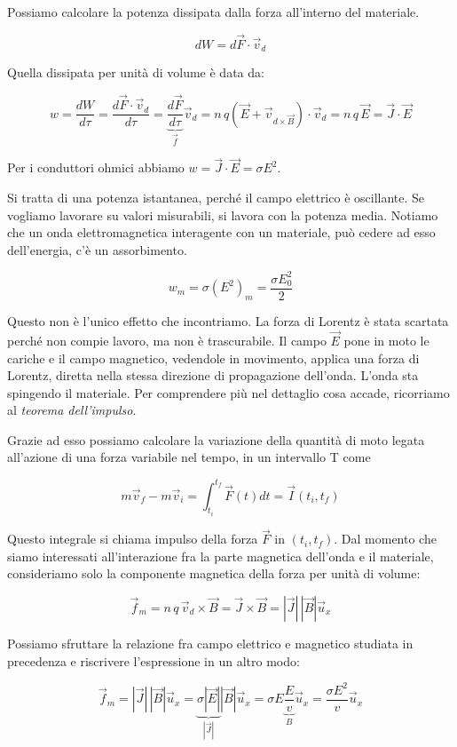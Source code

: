 Possiamo calcolare la potenza dissipata dalla forza all'interno del materiale.

\[
	dW=d\vec{F} \cdot \vec{v}_d
\]

Quella dissipata per unità di volume è data da:

\[
	w=\frac{dW}{d\tau}=\frac{d\vec{F} \cdot \vec{v}_d}{d\tau} = \underbrace{\frac{d\vec{F}}{d\tau}}_{\vec{f}}   \vec{v}_d  = n\,q(\vec{E} +\vec{v}_{d\times \vec{B}}  )\cdot \vec{v}_d = n\,q\,\vec{E} =\vec{J} \cdot \vec{E}
\]

Per i conduttori ohmici abbiamo $w = \vec{J} \cdot \vec{E} =\sigma E^2$.

Si tratta di una potenza istantanea, perché il campo elettrico è oscillante. Se vogliamo lavorare su valori misurabili, si lavora con la potenza media. Notiamo che un onda elettromagnetica interagente con un materiale, può cedere ad esso dell'energia, c'è un assorbimento.

\[
	w_m=\sigma (E^2)_m=\frac{\sigma E_0^2}{2}
\]

Questo non è l'unico effetto che incontriamo. La forza di Lorentz è stata scartata perché non compie lavoro, ma non è trascurabile. Il campo $\vec{E}$ pone in moto le cariche e il campo magnetico, vedendole in movimento, applica una forza di Lorentz, diretta nella stessa direzione di propagazione dell'onda. L'onda sta spingendo il materiale. Per comprendere più nel dettaglio cosa accade, ricorriamo al \emph{teorema dell'impulso}.

Grazie ad esso possiamo calcolare la variazione della quantità di moto legata all'azione di una forza variabile nel tempo, in un intervallo T come

\[
	m\vec{v}_f - m\vec{v}_i=\int_{t_i}^{t_f} \vec{F} (t)dt = \vec{I} (t_i,t_f  )
\]

Questo integrale si chiama impulso della forza $\vec{F}$ in $(t_i, t_f)$. Dal momento che siamo interessati all'interazione fra la parte magnetica dell'onda e il materiale, consideriamo solo la componente magnetica della forza per unità di volume:

\[
	\vec{f}_m = n\,q\,\vec{v}_d\times \vec{B} = \vec{J} \times \vec{B} = |\vec{J}|\,|\vec{B}|\vec{u}_x
\]

Possiamo sfruttare la relazione fra campo elettrico e magnetico studiata in precedenza e riscrivere l'espressione in un altro modo:

\[
	\vec{f}_m = |\vec{J}|\,|\vec{B}|\vec{u}_x = \underbrace{\sigma |\vec{E} |}_{|\vec{J}|} |\vec{B} |\vec{u}_x = \sigma E \underbrace{\frac{E}{v}}_B \vec{u}_x = \frac{\sigma E^2}{v}\vec{u}_x
\]

